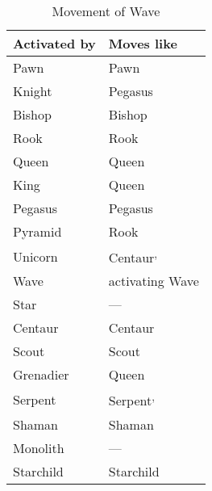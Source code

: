 \begin{table}[!h]
\centering
\begin{tabular}{ ll }
\toprule %
\textbf{Activated by}       & \textbf{Moves like}                       \\
\midrule %
Pawn                        & Pawn\footnotemark[1]                      \\
Knight                      & Pegasus                                   \\
Bishop                      & Bishop                                    \\
Rook                        & Rook                                      \\
Queen                       & Queen                                     \\
King                        & Queen                                     \\
\cmidrule{1-2} %
Pegasus                     & Pegasus                                   \\
Pyramid                     & Rook                                      \\
Unicorn                     & Centaur\footnotemark[1]\textsuperscript{,}\footnotemark[2] \\
Wave                        & activating Wave                           \\
Star                        & ---                                       \\
Centaur                     & Centaur                                   \\
Scout                       & Scout\footnotemark[1]                     \\
Grenadier                   & Queen\footnotemark[4]                     \\
Serpent                     & Serpent\footnotemark[1]\textsuperscript{,}\footnotemark[3] \\
Shaman                      & Shaman                                    \\
Monolith                    & ---                                       \\
Starchild                   & Starchild                                 \\
\bottomrule %
\end{tabular}
\caption{Movement of Wave}
\label{tbl:Appendix/Movement of Wave}
\end{table}

